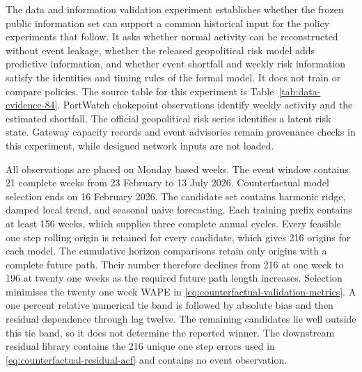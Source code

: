 \documentclass[a4paper,fleqn]{cas-sc}
\begin{document}
The data and information validation experiment establishes whether the frozen public information set can
support a common historical input for the policy experiments that follow. It
asks whether normal activity can be reconstructed without event leakage,
whether the released geopolitical risk model adds predictive information, and
whether event shortfall and weekly risk information satisfy the identities and
timing rules of the formal model. It does not train or compare policies. The
source table for this experiment is Table~\ref{tab:data-evidence-84}. PortWatch
chokepoint observations identify weekly activity and the estimated shortfall.
The official geopolitical risk series identifies a latent risk state. Gateway
capacity records and event advisories remain provenance checks in this
experiment, while designed network inputs are not loaded.

All observations are placed on Monday based weeks. The event window contains
21 complete weeks from 23 February to 13 July 2026. Counterfactual model
selection ends on 16 February 2026. The candidate set contains harmonic ridge,
damped local trend, and seasonal naive forecasting. Each training prefix
contains at least 156 weeks, which supplies three complete annual cycles. Every
feasible one step rolling origin is retained for every candidate, which gives
216 origins for each model. The cumulative horizon comparisons retain only
origins with a complete future path. Their number therefore declines from 216
at one week to 196 at twenty one weeks as the required future path length
increases. Selection minimises the twenty one week WAPE in
\cref{eq:counterfactual-validation-metrics}. A one percent relative numerical
tie band is followed by absolute bias and then residual dependence through lag
twelve. The remaining candidates lie well outside this tie band, so it does not
determine the reported winner. The downstream residual library contains the
216 unique one step errors used in \cref{eq:counterfactual-residual-acf} and
contains no event observation.
\end{document}
